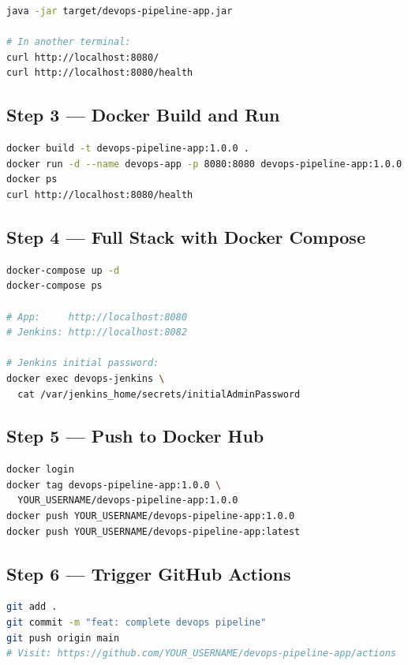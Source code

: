 \documentclass[12pt,a4paper]{report}
\begin{document}
\begin{lstlisting}[language=bash]
java -jar target/devops-pipeline-app.jar

# In another terminal:
curl http://localhost:8080/
curl http://localhost:8080/health
\end{lstlisting}

\subsection{Step 3 — Docker Build and Run}

\begin{lstlisting}[language=bash]
docker build -t devops-pipeline-app:1.0.0 .
docker run -d --name devops-app -p 8080:8080 devops-pipeline-app:1.0.0
docker ps
curl http://localhost:8080/health
\end{lstlisting}

\subsection{Step 4 — Full Stack with Docker Compose}

\begin{lstlisting}[language=bash]
docker-compose up -d
docker-compose ps

# App:     http://localhost:8080
# Jenkins: http://localhost:8082

# Jenkins initial password:
docker exec devops-jenkins \
  cat /var/jenkins_home/secrets/initialAdminPassword
\end{lstlisting}

\subsection{Step 5 — Push to Docker Hub}

\begin{lstlisting}[language=bash]
docker login
docker tag devops-pipeline-app:1.0.0 \
  YOUR_USERNAME/devops-pipeline-app:1.0.0
docker push YOUR_USERNAME/devops-pipeline-app:1.0.0
docker push YOUR_USERNAME/devops-pipeline-app:latest
\end{lstlisting}

\subsection{Step 6 — Trigger GitHub Actions}

\begin{lstlisting}[language=bash]
git add .
git commit -m "feat: complete devops pipeline"
git push origin main
# Visit: https://github.com/YOUR_USERNAME/devops-pipeline-app/actions
\end{lstlisting}
\end{document}
